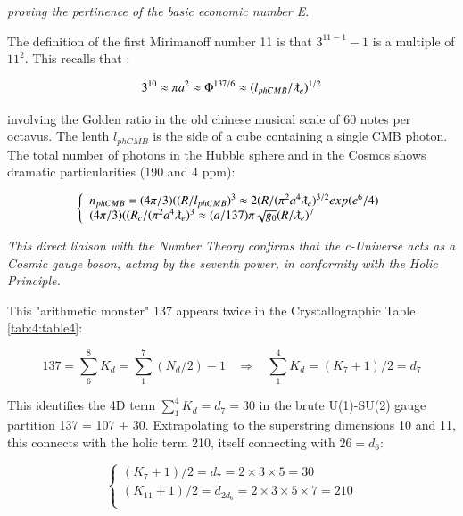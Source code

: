 \documentclass[a4paper,9pt]{article}
\newcounter{row}
\begin{document}
\textit{proving the pertinence of the basic economic number E}.

The definition of the first Mirimanoff number 11 is that $3^{11-1}-1$ is a multiple of $11^2$. This recalls that \cite{Sanchez5}:

\begin{equation}
3^{10} \approx \pi a^2 \approx \Phi^{137/6} \approx (l_{phCMB}/\lambdabar_e)^{1/2}
\end{equation}

involving the Golden ratio in the old chinese musical scale of 60 notes per octavus. The lenth $l_{phCMB}$
is the side of a cube containing a single CMB photon. The total number of photons in the Hubble sphere and in the Cosmos shows dramatic  particularities (190 and 4 ppm):

\begin{equation}
 \left\{
    \begin{array}{ll}
    n_{phCMB} = (4\pi/3)((R/l_{phCMB})^{3} \approx 2(R/(\pi^2a^4\lambdabar_e)^{3/2} exp(e^6/4)\\
    
     (4\pi/3)((R_c/(\pi^2a^4\lambdabar_e)^{3} \approx (a/137)\pi \sqrt{g_0} (R/\lambdabar_e)^7

    \end{array}
\right.
\end{equation}

\textit{This direct liaison with the Number Theory confirms that the c-Universe acts as a Cosmic gauge boson, acting by the seventh power, in conformity with the Holic Principle.}

This "arithmetic monster" 137 appears twice in the Crystallographic Table \ref{tab:4:table4}:

\begin{equation}\label{Eq36}
137 = \sum_6^8 K_d = \sum_1^7(N_d/2) -1   ~~~~ \Rightarrow~~~~ \sum_1^4K_d = (K_7+1)/2 = d_7  
 \end{equation}
 
This identifies the 4D term $\sum_1^4K_d =  d_7 = 30$ in the brute U(1)-SU(2) gauge partition 137 = 107 + 30\cite{Taylor}. Extrapolating to the superstring dimensions 10 and 11, this connects with the holic term 210, itself connecting with $26 = d_6$:
 
 \begin{equation}\label{Eq37}
 \left\{
    \begin{array}{ll}
          (K_7+1)/2 = d_7 = 2\times3\times5 = 30\\
          (K_{11}+1)/2 = d_{2d_6} = 2\times3\times5\times7 = 210 \\
    \end{array}
\right.
\end{equation}
\end{document}
